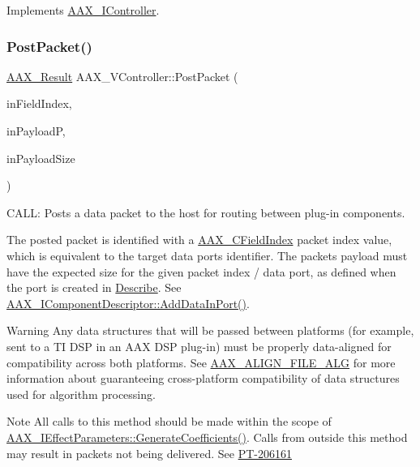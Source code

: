 Implements \mbox{\hyperlink{a01789_a1a654f682357d48bafd506cbbea2ae25}{A\+A\+X\+\_\+\+I\+Controller}}.

\mbox{\label{a01905_a30fc3c2b59094709ff2f143aac3c2239}} 
\subsubsection{\texorpdfstring{PostPacket()}{PostPacket()}}
{\footnotesize\ttfamily \mbox{\hyperlink{a00392_a4d8f69a697df7f70c3a8e9b8ee130d2f}{A\+A\+X\+\_\+\+Result}} A\+A\+X\+\_\+\+V\+Controller\+::\+Post\+Packet (\begin{DoxyParamCaption}\item[{\mbox{\hyperlink{a00392_ae807f8986143820cfb5d6da32165c9c7}{A\+A\+X\+\_\+\+C\+Field\+Index}}}]{in\+Field\+Index,  }\item[{const void $\ast$}]{in\+PayloadP,  }\item[{uint32\+\_\+t}]{in\+Payload\+Size }\end{DoxyParamCaption})\hspace{0.3cm}{\ttfamily [virtual]}}



C\+A\+LL\+: Posts a data packet to the host for routing between plug-\/in components. 

The posted packet is identified with a \mbox{\hyperlink{a00392_ae807f8986143820cfb5d6da32165c9c7}{A\+A\+X\+\_\+\+C\+Field\+Index}} packet index value, which is equivalent to the target data port\textquotesingle{}s identifier. The packet\textquotesingle{}s payload must have the expected size for the given packet index / data port, as defined when the port is created in \mbox{\hyperlink{a00796}{Describe}}. See \mbox{\hyperlink{a01781_a230293b9f6bb413626cd487ca501df75}{A\+A\+X\+\_\+\+I\+Component\+Descriptor\+::\+Add\+Data\+In\+Port()}}.

\begin{DoxyWarning}{Warning}
Any data structures that will be passed between platforms (for example, sent to a TI D\+SP in an A\+AX D\+SP plug-\/in) must be properly data-\/aligned for compatibility across both platforms. See \mbox{\hyperlink{a00392_a8fbeac3c5db5ac694e85a021ed74dc9e}{A\+A\+X\+\_\+\+A\+L\+I\+G\+N\+\_\+\+F\+I\+L\+E\+\_\+\+A\+LG}} for more information about guaranteeing cross-\/platform compatibility of data structures used for algorithm processing.
\end{DoxyWarning}
\begin{DoxyNote}{Note}
All calls to this method should be made within the scope of \mbox{\hyperlink{a01669_a083265b008921b6114ede387711694b7}{A\+A\+X\+\_\+\+I\+Effect\+Parameters\+::\+Generate\+Coefficients()}}. Calls from outside this method may result in packets not being delivered. See \mbox{\hyperlink{a00846_PT-206161}{P\+T-\/206161}}
\end{DoxyNote}

